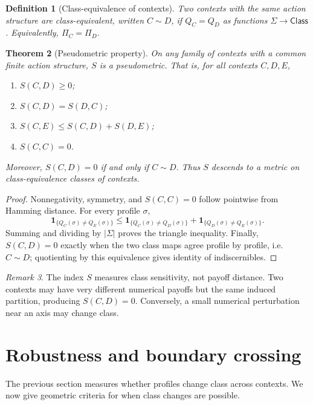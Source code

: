 \documentclass[a4paper,fleqn]{cas-dc}
\newtheorem{definition}{Definition}[section]
\newtheorem{theorem}[definition]{Theorem}
\theoremstyle{remark}
\newtheorem{remark}[definition]{Remark}
\newcommand{\Class}{\mathsf{Class}}
\newcommand{\Prof}{\Sigma}
\begin{document}
\begin{definition}[Class-equivalence of contexts]
Two contexts with the same action structure are class-equivalent, written $C\sim D$, if $Q_C=Q_D$ as functions $\Prof\to\Class$. Equivalently, $\Pi_C=\Pi_D$.
\end{definition}


\begin{theorem}[Pseudometric property]
\label{thm:pseudometric}
On any family of contexts with a common finite action structure, $S$ is a pseudometric. That is, for all contexts $C,D,E$,
\begin{enumerate}[label=(\alph*)]
\item $S(C,D)\ge 0$;
\item $S(C,D)=S(D,C)$;
\item $S(C,E)\le S(C,D)+S(D,E)$;
\item $S(C,C)=0$.
\end{enumerate}
Moreover, $S(C,D)=0$ if and only if $C\sim D$. Thus $S$ descends to a metric on class-equivalence classes of contexts.
\end{theorem}

\begin{proof}
Nonnegativity, symmetry, and $S(C,C)=0$ follow pointwise from Hamming
distance.  For every profile $\sigma$,
\[
\mathbf 1_{\{Q_C(\sigma)\ne Q_E(\sigma)\}}
\le
\mathbf 1_{\{Q_C(\sigma)\ne Q_D(\sigma)\}}
+
\mathbf 1_{\{Q_D(\sigma)\ne Q_E(\sigma)\}}.
\]
Summing and dividing by $|\Prof|$ proves the triangle inequality.  Finally,
$S(C,D)=0$ exactly when the two class maps agree profile by profile, i.e.
$C\sim D$; quotienting by this equivalence gives identity of indiscernibles.
\end{proof}

\begin{remark}
The index $S$ measures class sensitivity, not payoff distance. Two contexts may have very different numerical payoffs but the same induced partition, producing $S(C,D)=0$. Conversely, a small numerical perturbation near an axis may change class.
\end{remark}

\section{Robustness and boundary crossing}
\label{sec:robustness}

The previous section measures whether profiles change class across contexts. We now give geometric criteria for when class changes are possible.
\end{document}
